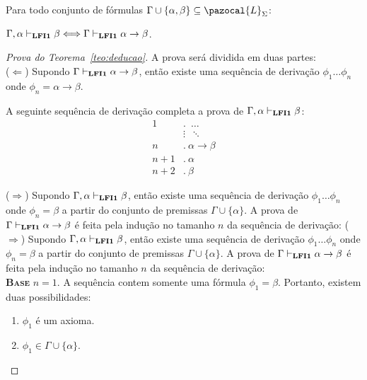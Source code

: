    
    \begin{teorema}\label{teo:deducao}
        Para todo conjunto de fórmulas $\Gamma \cup \{\alpha, \beta \} \subseteq \pazocal{L}_{\Sigma}$:

        \centering
        {\normalfont{} $\Gamma, \alpha \vdash_{\textbf{LFI1}{}} \beta \Longleftrightarrow \Gamma \vdash_{\textbf{LFI1}{}} \alpha \to \beta$.}
    \end{teorema}

    \begin{proof}[Prova do Teorema~\ref{teo:deducao}] A prova será dividida em duas partes:\\
        ($\Longleftarrow$) Supondo $\Gamma \vdash_{\textbf{LFI1}{}} \alpha \to \beta$, então existe uma sequência de derivação $\phi_{1} \ldots \phi_{n}$ onde $\phi_{n} = \alpha \to \beta$. 
        
        A seguinte sequência de derivação completa a prova de $\Gamma, \alpha \vdash_{\textbf{LFI1}{}} \beta$:
        \begin{align*}
            \text{1}&.~ \; \ldots\\
            & \vdots \; ~\ddots\\
            \text{$n$}&.~ \alpha \to \beta\tag{Suposição}\\
            \text{$n + 1$}&.~ \alpha\tag{Premissa}\\
            \text{$n + 2$}&.~ \beta\tag{MP $n, n + 1$}
        \end{align*}

        \noindent  ($\Longrightarrow$) Supondo $\Gamma, \alpha \vdash_{\textbf{LFI1}{}} \beta$, então existe uma sequência de derivação $\phi_{1} \ldots \phi_{n}$ onde $\phi_{n} = \beta$ a partir do conjunto de premissas $\Gamma \cup \{\alpha\}$. A prova de $\Gamma \vdash_{\textbf{LFI1}{}} \alpha \to \beta$ é feita pela indução no tamanho $n$ da sequência de derivação:
        \noindent  ($\Longrightarrow$) Supondo $\Gamma, \alpha \vdash_{\textbf{LFI1}{}} \beta$, então existe uma sequência de derivação $\phi_{1} \ldots \phi_{n}$ onde $\phi_{n} = \beta$ a partir do conjunto de premissas $\Gamma \cup \{\alpha\}$. A prova de $\Gamma \vdash_{\textbf{LFI1}{}} \alpha \to \beta$ é feita pela indução no tamanho $n$ da sequência de derivação:\\

        \noindent \textbf{\textsc{Base}} $n = 1$.
        A sequência contem somente uma fórmula $\phi_{1} = \beta$. Portanto, existem duas possibilidades:
        \begin{enumerate}
            \item $\phi_{1}$ é um axioma.
            \item $\phi_{1} \in \Gamma \cup \{\alpha\}$.
        \end{enumerate}


\end{proof}

